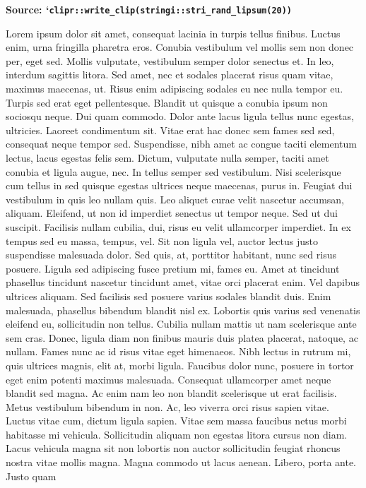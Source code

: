 \documentclass[10pt,landscape]{article}
\begin{document}
\begin{multicols*}{5}
\textbf{Source:
`\texttt{clipr::write\_clip(stringi::stri\_rand\_lipsum(20))}}

Lorem ipsum dolor sit amet, consequat lacinia in turpis tellus finibus.
Luctus enim, urna fringilla pharetra eros. Conubia vestibulum vel mollis
sem non donec per, eget sed. Mollis vulputate, vestibulum semper dolor
senectus et. In leo, interdum sagittis litora. Sed amet, nec et sodales
placerat risus quam vitae, maximus maecenas, ut. Risus enim adipiscing
sodales eu nec nulla tempor eu. Turpis sed erat eget pellentesque.
Blandit ut quisque a conubia ipsum non sociosqu neque. Dui quam commodo.
Dolor ante lacus ligula tellus nunc egestas, ultricies. Laoreet
condimentum sit. Vitae erat hac donec sem fames sed sed, consequat neque
tempor sed. Suspendisse, nibh amet ac congue taciti elementum lectus,
lacus egestas felis sem. Dictum, vulputate nulla semper, taciti amet
conubia et ligula augue, nec. In tellus semper sed vestibulum. Nisi
scelerisque cum tellus in sed quisque egestas ultrices neque maecenas,
purus in. Feugiat dui vestibulum in quis leo nullam quis. Leo aliquet
curae velit nascetur accumsan, aliquam. Eleifend, ut non id imperdiet
senectus ut tempor neque. Sed ut dui suscipit. Facilisis nullam cubilia,
dui, risus eu velit ullamcorper imperdiet. In ex tempus sed eu massa,
tempus, vel. Sit non ligula vel, auctor lectus justo suspendisse
malesuada dolor. Sed quis, at, porttitor habitant, nunc sed risus
posuere. Ligula sed adipiscing fusce pretium mi, fames eu. Amet at
tincidunt phasellus tincidunt nascetur tincidunt amet, vitae orci
placerat enim. Vel dapibus ultrices aliquam. Sed facilisis sed posuere
varius sodales blandit duis. Enim malesuada, phasellus bibendum blandit
nisl ex. Lobortis quis varius sed venenatis eleifend eu, sollicitudin
non tellus. Cubilia nullam mattis ut nam scelerisque ante sem cras.
Donec, ligula diam non finibus mauris duis platea placerat, natoque, ac
nullam. Fames nunc ac id risus vitae eget himenaeos. Nibh lectus in
rutrum mi, quis ultrices magnis, elit at, morbi ligula. Faucibus dolor
nunc, posuere in tortor eget enim potenti maximus malesuada. Consequat
ullamcorper amet neque blandit sed magna. Ac enim nam leo non blandit
scelerisque ut erat facilisis. Metus vestibulum bibendum in non. Ac, leo
viverra orci risus sapien vitae. Luctus vitae cum, dictum ligula sapien.
Vitae sem massa faucibus netus morbi habitasse mi vehicula. Sollicitudin
aliquam non egestas litora cursus non diam. Lacus vehicula magna sit non
lobortis non auctor sollicitudin feugiat rhoncus nostra vitae mollis
magna. Magna commodo ut lacus aenean. Libero, porta ante. Justo quam

\end{multicols*}
\end{document}
